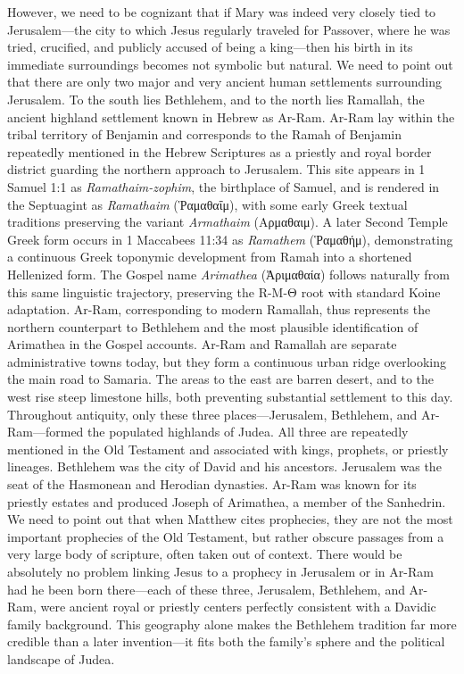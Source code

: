 However, we need to be cognizant that if Mary was indeed very closely tied to Jerusalem---the city to which Jesus regularly traveled for Passover, where he was tried, crucified, and publicly accused of being a king---then his birth in its immediate surroundings becomes not symbolic but natural.
We need to point out that there are only two major and very ancient human settlements surrounding Jerusalem.
To the south lies Bethlehem, and to the north lies Ramallah, the ancient highland settlement known in Hebrew as Ar-Ram.
Ar-Ram lay within the tribal territory of Benjamin and corresponds to the Ramah of Benjamin repeatedly mentioned in the Hebrew Scriptures as a priestly and royal border district guarding the northern approach to Jerusalem.
This site appears in 1 Samuel 1:1 as \emph{Ramathaim-zophim}, the birthplace of Samuel, and is rendered in the Septuagint as \emph{Ramathaim} (Ῥαμαθαΐμ), with some early Greek textual traditions preserving the variant \emph{Armathaim} (Αρμαθαιμ).
A later Second Temple Greek form occurs in 1 Maccabees 11:34 as \emph{Ramathem} (Ῥαμαθήμ), demonstrating a continuous Greek toponymic development from Ramah into a shortened Hellenized form.
The Gospel name \emph{Arimathea} (Ἀριμαθαία) follows naturally from this same linguistic trajectory, preserving the R-M-Θ root with standard Koine adaptation.
Ar-Ram, corresponding to modern Ramallah, thus represents the northern counterpart to Bethlehem and the most plausible identification of Arimathea in the Gospel accounts.
Ar-Ram and Ramallah are separate administrative towns today, but they form a continuous urban ridge overlooking the main road to Samaria.
The areas to the east are barren desert, and to the west rise steep limestone hills, both preventing substantial settlement to this day.
Throughout antiquity, only these three places---Jerusalem, Bethlehem, and Ar-Ram---formed the populated highlands of Judea.
All three are repeatedly mentioned in the Old Testament and associated with kings, prophets, or priestly lineages.
Bethlehem was the city of David and his ancestors.
Jerusalem was the seat of the Hasmonean and Herodian dynasties.
Ar-Ram was known for its priestly estates and produced Joseph of Arimathea, a member of the Sanhedrin.
We need to point out that when Matthew cites prophecies, they are not the most important prophecies of the Old Testament, but rather obscure passages from a very large body of scripture, often taken out of context.
There would be absolutely no problem linking Jesus to a prophecy in Jerusalem or in Ar-Ram had he been born there---each of these three, Jerusalem, Bethlehem, and Ar-Ram, were ancient royal or priestly centers perfectly consistent with a Davidic family background.
This geography alone makes the Bethlehem tradition far more credible than a later invention---it fits both the family’s sphere and the political landscape of Judea.


